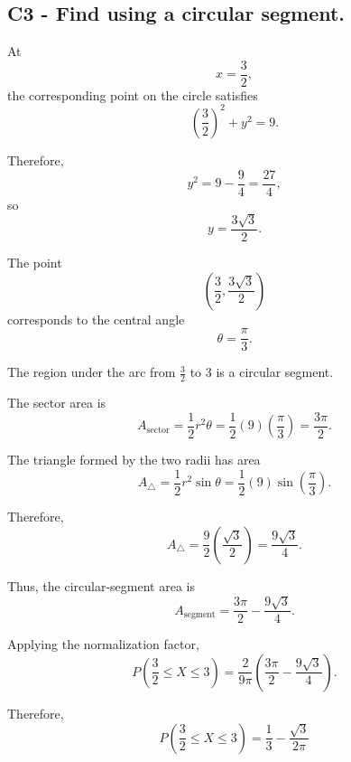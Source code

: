 {	
	\label{subsec:circular-arc-measurement-model-c3-c}
	\subsection*{C3 - Find  using a circular segment. }
	
	At
	\[
	x=\frac{3}{2},
	\]
	the corresponding point on the circle satisfies
	\[
	\left(\frac{3}{2}\right)^2+y^2=9.
	\]
	
	Therefore,
	\[
	y^2
	=9-\frac{9}{4}
	=\frac{27}{4},
	\]
	so
	\[
	y=\frac{3\sqrt{3}}{2}.
	\]
	
	The point
	\[
	\left(
	\frac{3}{2},
	\frac{3\sqrt{3}}{2}
	\right)
	\]
	corresponds to the central angle
	\[
	\theta=\frac{\pi}{3}.
	\]
	
	The region under the arc from $\frac{3}{2}$ to $3$ is a circular segment.
	
	The sector area is
	\[
	A_{\text{sector}}
	=\frac{1}{2}r^2\theta
	=\frac{1}{2}(9)\left(\frac{\pi}{3}\right)
	=\frac{3\pi}{2}.
	\]
	
	The triangle formed by the two radii has area
	\[
	A_{\triangle}
	=
	\frac{1}{2}r^2\sin\theta
	=
	\frac{1}{2}(9)\sin\left(\frac{\pi}{3}\right).
	\]
	
	Therefore,
	\[
	A_{\triangle}
	=
	\frac{9}{2}\left(\frac{\sqrt{3}}{2}\right)
	=
	\frac{9\sqrt{3}}{4}.
	\]
	
	Thus, the circular-segment area is
	\[
	A_{\text{segment}}
	=
	\frac{3\pi}{2}
	-
	\frac{9\sqrt{3}}{4}.
	\]
	
	Applying the normalization factor,
	\[
	P\left(\frac{3}{2}\le X\le3\right)
	=
	\frac{2}{9\pi}
	\left(
	\frac{3\pi}{2}
	-
	\frac{9\sqrt{3}}{4}
	\right).
	\]
	
	Therefore,
	\[
	\boxed{
		P\left(\frac{3}{2}\le X\le3\right)
		=
		\frac{1}{3}
		-
		\frac{\sqrt{3}}{2\pi}
	}
	\]
	

	}

